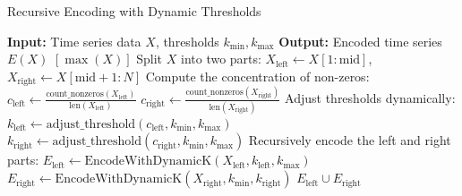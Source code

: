 \documentclass[onecolumn,conference]{IEEEtran}
\begin{document}
\begin{algorithm}[H]
\caption{Recursive Encoding with Dynamic Thresholds}
\label{alg:dynamic_encoding}
\begin{algorithmic}[1]
\STATE \textbf{Input:} Time series data \( X \), thresholds \( k_{\text{min}}, k_{\text{max}} \)
\STATE \textbf{Output:} Encoded time series \( E(X) \)
\STATE
{}
    \RETURN \( [\max(X)] \) 
\ENDIF
\STATE Split \( X \) into two parts:
\STATE \hspace{0.5cm} \( X_{\text{left}} \gets X[1:\text{mid}] \), \( X_{\text{right}} \gets X[\text{mid}+1:N] \)
\STATE Compute the concentration of non-zeros:
\STATE \hspace{0.5cm} \( c_{\text{left}} \gets \frac{\text{count\_nonzeros}(X_{\text{left}})}{\text{len}(X_{\text{left}})} \)
\STATE \hspace{0.5cm} \( c_{\text{right}} \gets \frac{\text{count\_nonzeros}(X_{\text{right}})}{\text{len}(X_{\text{right}})} \)
\STATE Adjust thresholds dynamically:
\STATE \hspace{0.5cm} \( k_{\text{left}} \gets \text{adjust\_threshold}(c_{\text{left}}, k_{\text{min}}, k_{\text{max}}) \)
\STATE \hspace{0.5cm} \( k_{\text{right}} \gets \text{adjust\_threshold}(c_{\text{right}}, k_{\text{min}}, k_{\text{max}}) \)
\STATE Recursively encode the left and right parts:
\STATE \hspace{0.5cm} \( E_{\text{left}} \gets \text{EncodeWithDynamicK}(X_{\text{left}}, k_{\text{left}}, k_{\text{max}}) \)
\STATE \hspace{0.5cm} \( E_{\text{right}} \gets \text{EncodeWithDynamicK}(X_{\text{right}}, k_{\text{min}}, k_{\text{right}}) \)
\STATE \RETURN \( E_{\text{left}} \cup E_{\text{right}} \) 
\end{algorithmic}
\end{algorithm}
\end{document}
